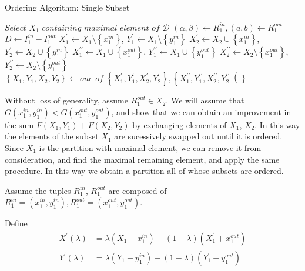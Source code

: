 \documentclass{article}
\theoremstyle{case}
\begin{document}
\begin{algorithm}
\caption{Ordering Algorithm: Single Subset}
\begin{algorithmic}[1]
\State $\textit{Select } X_1 \textit{ containing maximal element of } \mathcal{D}$
\State $\left( \alpha , \beta \right) \gets R_1^{in}, \left( a,b \right) \gets R_1^{out}$
\State $D \gets I_1^{in} - I_1^{out}$
\State $X_1^\prime \gets X_1\setminus \left\lbrace x_1^{in}\right\rbrace$, $Y_1^{\prime} \gets X_1\setminus \left\lbrace y_1^{in}\right\rbrace$
\State $X_2^{\prime} \gets X_2\cup \left\lbrace x_1^{in}\right\rbrace$, $Y_2^{\prime} \gets X_2\cup \left\lbrace y_1^{in}\right\rbrace$
\EndIf
{}
\State $X_1^{\prime\prime} \gets X_1\cup \left\lbrace x_1^{out}\right\rbrace$, $Y_1^{\prime\prime} \gets X_1\cup \left\lbrace y_1^{out}\right\rbrace$
\State $X_2^{\prime\prime} \gets X_2\setminus \left\lbrace x_1^{out}\right\rbrace$, $Y_2^{\prime\prime} \gets X_2\setminus \left\lbrace y_1^{out}\right\rbrace$
\EndIf
{}
\State $\left\lbrace X_1, Y_1, X_2, Y_2 \right\rbrace \gets \textit{one of } \left\lbrace X_1^{\prime}, Y_1^{\prime}, X_2^{\prime}, Y_2^{\prime}\right\rbrace, \left\lbrace X_1^{\prime\prime}, Y_1^{\prime\prime}, X_2^{\prime\prime}, Y_2^{\prime\prime}\right(\rbrace$
\EndIf
{}
\EndWhile
\end{algorithmic}
\end{algorithm}

Without loss of generality, assume $R_1^{out} \in X_2$. We will assume that $G(x_1^{in}, y_1^{in}) < G(x_1^{out}, y_1^{out})$, and show that we can obtain an improvement in the sum $F(X_1, Y_1) + F(X_2, Y_2)$ by exchanging elements of $X_1$, $X_2$. In this way the elements of the subset $X_1$ are sucessively swapped out until it is ordered. Since $X_1$ is the partition with maximal element, we can remove it from consideration, and find the maximal remaining element, and apply the same procedure. In this way we obtain a partition all of whose subsets are ordered.

Assume the tuples $R_1^{in}$, $R_1^{out}$ are composed of $R_1^{in} = \left(x_1^{in}, y_1^{in}\right), R_1^{out} = \left(x_1^{out}, y_1^{out}\right)$.

Define
\begin{align*}
X^\prime\left( \lambda \right) & = \lambda \left( X_1 - x_1^{in}\right) + \left( 1 - \lambda\right) \left( X_1^\prime + x_1^{out}\right) \\
Y^\prime\left( \lambda \right) & = \lambda \left( Y_1 - y_1^{in}\right) + \left( 1 - \lambda\right) \left( Y_1^\prime + y_1^{out}\right)
\end{align*}
\end{document}
